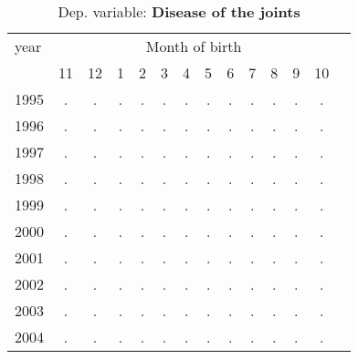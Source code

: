  \begin{table}[H] \begin{threeparttable} \centering \caption{Dep. variable: \textbf{Disease of the joints}} {\def\sym#1{\ifmmode^{#1}\else\(^{#1}\)\fi} \begin{tabular}{l*{13}{c}} \toprule year & \multicolumn{12}{c}{Month of birth} \\ \cmidrule(lr){2-13} 
            &          11&          12&           1&           2&           3&           4&           5&           6&           7&           8&           9&          10\\
1995        &           .&           .&           .&           .&           .&           .&           .&           .&           .&           .&           .&           .\\
1996        &           .&           .&           .&           .&           .&           .&           .&           .&           .&           .&           .&           .\\
1997        &           .&           .&           .&           .&           .&           .&           .&           .&           .&           .&           .&           .\\
1998        &           .&           .&           .&           .&           .&           .&           .&           .&           .&           .&           .&           .\\
1999        &           .&           .&           .&           .&           .&           .&           .&           .&           .&           .&           .&           .\\
2000        &           .&           .&           .&           .&           .&           .&           .&           .&           .&           .&           .&           .\\
2001        &           .&           .&           .&           .&           .&           .&           .&           .&           .&           .&           .&           .\\
2002        &           .&           .&           .&           .&           .&           .&           .&           .&           .&           .&           .&           .\\
2003        &           .&           .&           .&           .&           .&           .&           .&           .&           .&           .&           .&           .\\
2004        &           .&           .&           .&           .&           .&           .&           .&           .&           .&           .&           .&           .\\

\end{tabular}}
\end{threeparttable}
\end{table}

